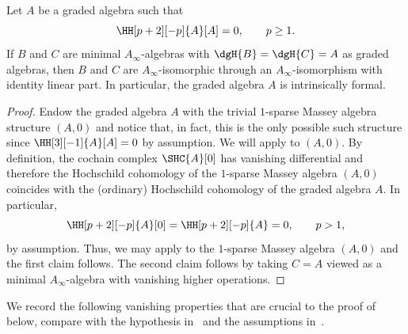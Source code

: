 \documentclass[a4paper]{amsart}
\begin{document}
\begin{corollary}
  \label{coro:Kadeishvili}
  Let $A$ be a graded algebra such that
  \[
    \HH[p+2][-p]{A}[A]=0,\qquad p\geq1.
  \]
  If $B$ and $C$ are minimal $A_\infty$-algebras with $\dgH{B}=\dgH{C}=A$ as
  graded algebras, then $B$ and $C$ are $A_\infty$-isomorphic through an
  $A_\infty$-isomorphism with identity linear part. In particular, the graded
  algebra $A$ is intrinsically formal.
\end{corollary}
\begin{proof}
  Endow the graded algebra $A$ with the trivial $1$-sparse Massey algebra
  structure $(A,0)$ and notice that, in fact, this is the only possible
  such structure since $\HH[3][-1]{A}[A]=0$ by assumption. We will apply
   to $(A,0)$. By definition, the cochain
  complex $\SHC{A}[0]$ has vanishing differential and therefore the
  Hochschild cohomology of the $1$-sparse Massey algebra $(A,0)$
  coincides with the (ordinary) Hochschild cohomology of the graded algebra $A$.
  In particular,
  \[
    \HH[p+2][-p]{A}[0]=\HH[p+2][-p]{A}=0,\qquad p>1,
  \]
  by assumption. Thus, we may apply  to
  the $1$-sparse Massey algebra $(A,0)$ and the first claim follows. The second
  claim follows by taking $C=A$ viewed as a minimal $A_\infty$-algebra with
  vanishing higher operations.
\end{proof}

We record the following vanishing properties that are crucial to the proof of
 below, compare with the hypothesis
in~ and the assumptions in~.
\end{document}

